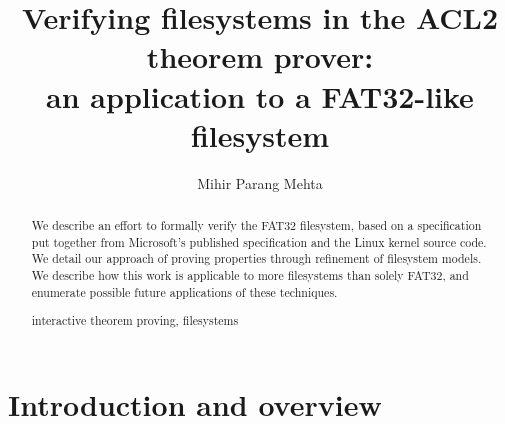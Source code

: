 \documentclass[runningheads,a4paper]{llncs}
\newcommand{\keywords}[1]{\par\addvspace\baselineskip
\noindent\keywordname\enspace\ignorespaces#1}
\begin{document}
\mainmatter  %

\title{Verifying filesystems in the ACL2 theorem prover:\\ an
  application to a FAT32-like filesystem}


%
%
\author{Mihir Parang Mehta}
%


%
%

\maketitle

\begin{abstract}
  We describe an effort to formally verify the FAT32 filesystem, based
  on a specification put together from Microsoft's published
  specification and the Linux kernel source code. We detail our
  approach of proving properties through refinement of filesystem
  models. We describe how this work is applicable to more filesystems
  than solely FAT32, and enumerate possible future applications of
  these techniques.
\keywords{interactive theorem proving, filesystems}
\end{abstract}

\section{Introduction and overview}
\end{document}
